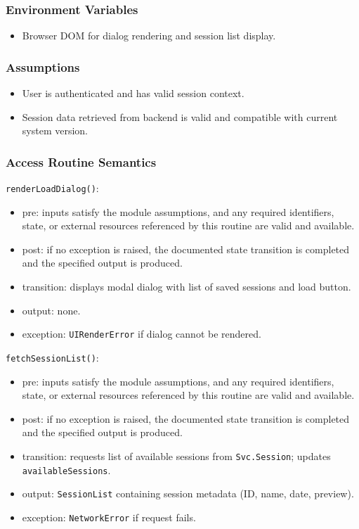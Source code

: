 \documentclass[12pt, titlepage]{article}
\begin{document}
\subsubsection{Environment Variables}
\begin{itemize}
    \item Browser DOM for dialog rendering and session list display.
\end{itemize}

\subsubsection{Assumptions}
\begin{itemize}
    \item User is authenticated and has valid session context.
    \item Session data retrieved from backend is valid and compatible with current system version.
\end{itemize}

\subsubsection{Access Routine Semantics}

\noindent \texttt{renderLoadDialog()}:
\begin{itemize}
    \item pre: inputs satisfy the module assumptions, and any required identifiers, state, or external resources referenced by this routine are valid and available.
    \item post: if no exception is raised, the documented state transition is completed and the specified output is produced.
    \item transition: displays modal dialog with list of saved sessions and load button.
    \item output: none.
    \item exception: \texttt{UIRenderError} if dialog cannot be rendered.
\end{itemize}

\noindent \texttt{fetchSessionList()}:
\begin{itemize}
    \item pre: inputs satisfy the module assumptions, and any required identifiers, state, or external resources referenced by this routine are valid and available.
    \item post: if no exception is raised, the documented state transition is completed and the specified output is produced.
    \item transition: requests list of available sessions from \texttt{Svc.Session}; updates \texttt{availableSessions}.
    \item output: \texttt{SessionList} containing session metadata (ID, name, date, preview).
    \item exception: \texttt{NetworkError} if request fails.
\end{itemize}
\end{document}
